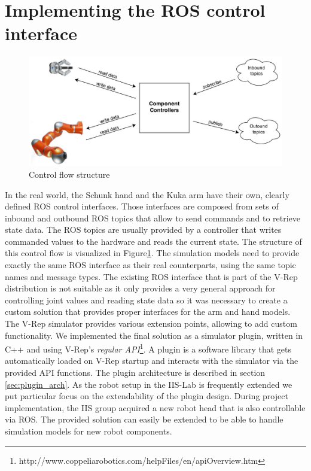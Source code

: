 \section{Implementing the ROS control interface}

\begin{figure}[ht]
	\centering
  	\includegraphics[width=1.0\textwidth]{images/control_flow.jpg}
	\caption{Control flow structure}
	\label{fig:control_flow}
\end{figure}

In the real world, the Schunk hand and the Kuka arm have their own, clearly defined ROS control interfaces. Those interfaces are composed from sets of inbound and outbound ROS topics that allow to send commands and to retrieve state data. The ROS topics are usually provided by a controller that writes commanded values to the hardware and reads the current state. The structure of this control flow is visualized in Figure\ref{fig:control_flow}. The simulation models need to provide exactly the same ROS interface as their real counterparts, using the same topic names and message types. The existing ROS interface that is part of the V-Rep distribution is not suitable as it only provides a very general approach for controlling joint values and reading state data so it was necessary to create a custom solution that provides proper interfaces for the arm and hand models. \\

The V-Rep simulator provides various extension points, allowing to add custom functionality. We implemented the final solution as a simulator plugin, written in C++ and using V-Rep's \emph{regular API}\footnote{http://www.coppeliarobotics.com/helpFiles/en/apiOverview.htm}. A plugin is a software library that gets automatically loaded on V-Rep startup and interacts with the simulator via the provided API functions. The plugin architecture is described in section \ref{sec:plugin_arch}. As the robot setup in the IIS-Lab is frequently extended we put particular focus on the extendability of the plugin design. During project implementation, the IIS group acquired a new robot head that is also controllable via ROS. The provided solution can easily be extended to be able to handle simulation models for new robot components. \\

